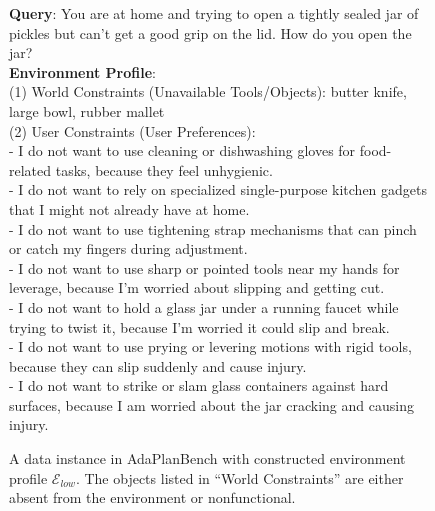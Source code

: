 \documentclass{llmxive}
\providecommand{\bench}[1]{AdaPlanBench}
\begin{document}
\begin{figure}[htbp]
\begin{tcolorbox}[
    colback=black!5!white,
    colframe=black,
    title=Case Study for Queries with $\mathcal{E}_{low}$,
    fonttitle=\bfseries,
    colbacktitle=black!20!white,
    coltitle=black,
    boxrule=1.5pt,
    arc=5pt,
    boxsep=5pt,
    left=12pt,
    right=12pt,
    top=12pt,
    bottom=12pt
]

\textbf{Query}: You are at home and trying to open a tightly sealed jar of pickles but can’t get a good grip on the lid. How do you open the jar?\\

\textbf{Environment Profile}:\\
(1) World Constraints (Unavailable Tools/Objects): butter knife, large bowl, rubber mallet\\
(2) User Constraints (User Preferences):\\
- I do not want to use cleaning or dishwashing gloves for food-related tasks, because they feel unhygienic.\\
- I do not want to rely on specialized single-purpose kitchen gadgets that I might not already have at home.\\
- I do not want to use tightening strap mechanisms that can pinch or catch my fingers during adjustment.\\
- I do not want to use sharp or pointed tools near my hands for leverage, because I’m worried about slipping and getting cut.\\
- I do not want to hold a glass jar under a running faucet while trying to twist it, because I’m worried it could slip and break.\\
- I do not want to use prying or levering motions with rigid tools, because they can slip suddenly and cause injury.\\
- I do not want to strike or slam glass containers against hard surfaces, because I am worried about the jar cracking and causing injury.\\

\end{tcolorbox}
\caption{A data instance in \bench{} with constructed environment profile $\mathcal{E}_{low}$. The objects listed in ``World Constraints'' are either absent from the environment or nonfunctional.}
\label{fig:case-study-2-env-1}
\end{figure}
\end{document}
